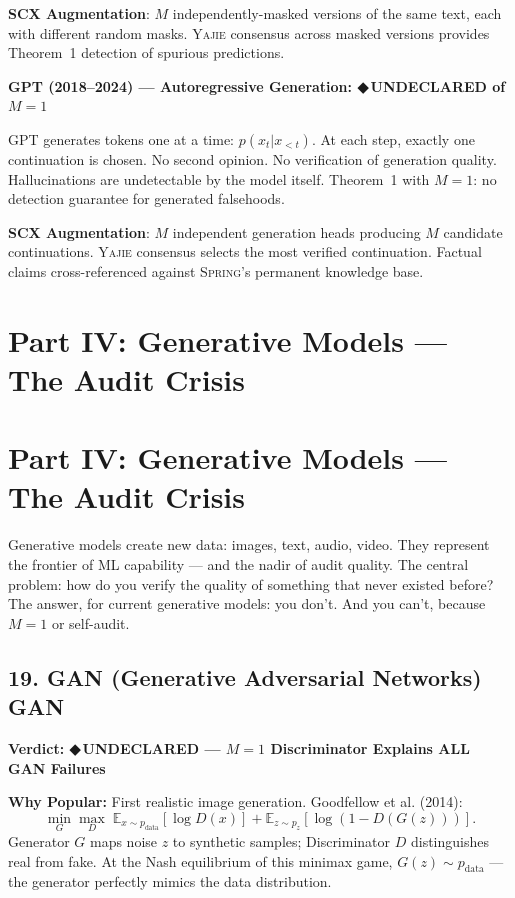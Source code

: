 \documentclass[12pt,a4paper]{article}
\theoremstyle{definition}
\newcommand{\guilty}{{\color{guiltycolor}\textbf{◆\,UNDECLARED}}}
\newcommand{\Yajie}{\textsc{Yajie}}
\newcommand{\Spring}{\textsc{Spring}}
\newcommand{\E}{\mathbb{E}}
\newcommand{\auditHeader}[1]{\medskip\noindent\textbf{\large #1}\medskip}
\newcommand{\whyPopular}{\noindent\textbf{Why Popular:} }
\begin{document}
\textbf{SCX Augmentation}: $M$ independently-masked versions of the same text, each with different random masks. \Yajie{} consensus across masked versions provides Theorem~1 detection of spurious predictions.

\auditHeader{GPT (2018--2024) — Autoregressive Generation: \guilty{} of $M=1$}

GPT generates tokens one at a time: $p(x_t | x_{<t})$. At each step, exactly one continuation is chosen. No second opinion. No verification of generation quality. Hallucinations are undetectable by the model itself. Theorem~1 with $M=1$: no detection guarantee for generated falsehoods.

\textbf{SCX Augmentation}: $M$ independent generation heads producing $M$ candidate continuations. \Yajie{} consensus selects the most verified continuation. Factual claims cross-referenced against \Spring{}'s permanent knowledge base.

\section{Part IV: Generative Models — The Audit Crisis}
\section{Part IV: Generative Models --- The Audit Crisis}
\label{sec:generative}

Generative models create new data: images, text, audio, video. They represent the frontier of ML capability — and the nadir of audit quality. The central problem: how do you verify the quality of something that never existed before? The answer, for current generative models: you don't. And you can't, because $M=1$ or self-audit.

\subsection{19. GAN (Generative Adversarial Networks) GAN}

\auditHeader{Verdict: \guilty{} — $M=1$ Discriminator Explains ALL GAN Failures}

\whyPopular{} First realistic image generation. Goodfellow et al. (2014):
\[
\min_G \max_D \; \E_{x \sim p_{\text{data}}}[\log D(x)] + \E_{z \sim p_z}[\log(1 - D(G(z)))].
\]
Generator $G$ maps noise $z$ to synthetic samples; Discriminator $D$ distinguishes real from fake. At the Nash equilibrium of this minimax game, $G(z) \sim p_{\text{data}}$ — the generator perfectly mimics the data distribution.
\end{document}
